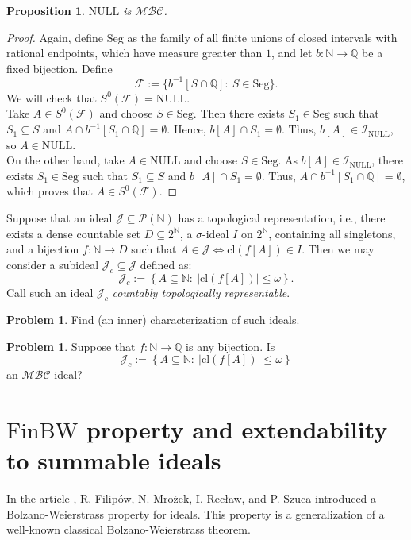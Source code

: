 \documentclass{amsart}
\newtheorem{prop}[thm]{Proposition}
\theoremstyle{definition}
\newtheorem{problem}[thm]{Problem}
\newcommand{\N}{{\mathbb N}}
\newcommand{\Q}{{\mathbb Q}}
\newcommand{\I}{\mathcal I}
\newcommand{\J}{\mathcal J}
\newcommand{\calF}{\mathcal{F}}
\newcommand{\finbw}{\text{FinBW}}
\newcommand{\MB}{S^0}
\newcommand{\MBC}{\mathcal{MBC}}
\newcommand{\Seg}{\mathrm{Seg}}
\newcommand{\NULL}{\mathrm{NULL}}
\newcommand{\INULL}{\I_\mathrm{NULL}}
\newcommand{\cl}{\mathrm{cl}}
\begin{document}
\begin{prop}
$\NULL$ is $\MBC$.
\end{prop}

\begin{proof}
Again, define $\Seg$ as the family of all finite unions of closed intervals with rational endpoints, which have measure greater than $1$, and let $b\colon \N \to \Q$ be a fixed bijection.
Define 
$$\calF := \{b^{-1}[S\cap\Q] :\ S\in\Seg\}.$$
We will check that $\MB(\calF) = \NULL$.\\
Take $A\in \MB(\calF)$ and choose $S\in\Seg$. Then there exists $S_1\in\Seg$ such that $S_1\subseteq S$ and $A\cap b^{-1}[S_1\cap\Q] = \emptyset$. Hence, $b[A] \cap S_1 = \emptyset$. Thus, $b[A]\in\INULL$, so $A\in\NULL$.\\
On the other hand, take $A\in \NULL$ and choose $S\in\Seg$. As $b[A]\in\INULL$, there exists $S_1\in \Seg$ such that $S_1\subseteq S$ and $b[A]\cap S_1 = \emptyset$. Thus, $A \cap b^{-1}[S_1\cap\Q] = \emptyset$, which proves that $A\in \MB(\calF)$.
\end{proof}


Suppose that an ideal $\mathcal{J}\subseteq \mathcal{P}(\N)$ has a topological representation, i.e., there exists a dense countable set $D\subseteq 2^{\N}$, a $\sigma$-ideal $I$ on $2^{\N}$, containing all singletons, and a bijection $f\colon\N\to D$ such that $A\in\J \Leftrightarrow \cl(f[A])\in I$. Then we may consider a subideal $\J_c \subseteq \J$ defined as:
$$\J_c :=\left\{A\subseteq \N :\ |\cl(f[A])| \leq \omega\right\}.$$
Call such an ideal $\J_c$ \emph{countably topologically representable}.

\begin{problem}
Find (an inner) characterization of such ideals.
\end{problem}

\begin{problem}
Suppose that $f\colon\N\to\Q$ is any bijection. Is 
$$\J_c :=\left\{A\subseteq \N :\ |\cl(f[A])| \leq \omega\right\}$$
an $\MBC$ ideal?
\end{problem}

  
\section{$\finbw$ property and extendability to summable ideals}		



In the article \cite{H1}, R. Filip\'ow, N. Mro\.zek, I. Rec\l{}aw, and P. Szuca introduced a Bolzano-Weierstrass property for ideals. This property is a generalization of a well-known classical Bolzano-Weierstrass theorem.
\end{document}
